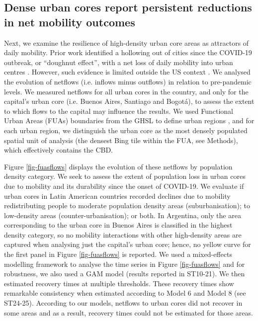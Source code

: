 \documentclass[fleqn,10pt]{wlscirep}
\begin{document}
\subsection*{Dense urban cores report persistent reductions in net mobility outcomes}

Next, we examine the resilience of high-density urban core areas as attractors of daily mobility. Prior work identified a hollowing out of cities since the COVID-19 outbreak, or ``doughnut effect'', with a net loss of daily mobility into urban centres \cite{ramani2024working}. However, such evidence is limited outside the US context \cite{ramani2024working, gonzalez2023donut}. We analysed the evolution of netflows (i.e. inflows minus outflows) in relation to pre-pandemic levels. We measured netflows for all urban cores in the country, and only for the capital's urban core (i.e. Buenos Aires, Santiago and Bogotá), to assess the extent to which flows to the capital may influence the results. We used Functional Urban Areas (FUAs) boundaries from the GHSL to define urban regions \cite{ceu.jrc.2019}, and for each urban region, we distinguish the urban core as the most densely populated spatial unit of analysis (the densest Bing tile within the FUA, see Methods), which effectively contains the CBD. 

Figure \ref{fig-fuasflows} displays the evolution of these netflows by population density category. We seek to assess the extent of population loss in urban cores due to mobility and its durability since the onset of COVID-19. We evaluate if urban cores in Latin American countries recorded declines due to mobility redistributing people to moderate population density areas (suburbanisation); to low-density areas (counter-urbanisation); or both. In Argentina, only the area corresponding to the urban core in Buenos Aires is classified in the highest density category, so no mobility interactions with other high-density areas are captured when analysing just the capital's urban core; hence, no yellow curve for the first panel in Figure \ref{fig-fuasflows} is reported. We used a mixed-effects modelling framework to analyse the time series in Figure \ref{fig-fuasflows} and for robustness, we also used a GAM model (results reported in ST10-21). We then estimated recovery times at multiple thresholds. These recovery times show remarkable consistency when estimated according to Model 6 and Model 8 (see 
ST24-25). According to our models, netflows to urban cores did not recover in some areas and as a result, recovery times could not be estimated for those areas.
\end{document}
